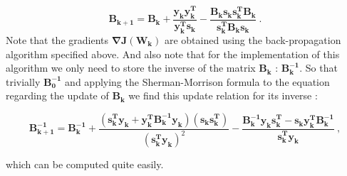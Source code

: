 \documentclass[a4paper,12pt,twoside]{article}
\newcommand{\matr}[1] {\bm{#1}}
\begin{document}
\begin{equation}
\matr{B_{k+1}} = \matr{B_k} + \frac{\mathbf{y_k}\mathbf{y_k^T}}{\mathbf{y_k^T}\mathbf{s_k}} - \frac{\matr{B_k}\mathbf{s_k}\mathbf{s_k^T}\matr{B_k}}{\mathbf{s_k^T}\matr{B_k}\mathbf{s_k}}~.
\end{equation}
Note that the gradients $\mathbf{\nabla J (\mathbf{W_k})}$ are obtained using the back-propagation algorithm specified above. And also note that for the implementation of this algorithm we only need to store the inverse of the matrix $\matr{B_k}$ : $\matr{B_k^{-1}}$. So that trivially $\matr{B_0^{-1}}$ and applying the Sherman-Morrison formula to the equation regarding the update of $\matr{B_k}$ we find this update relation for its inverse : 

\begin{equation}
\matr{B_{k+1}^{-1}} = \matr{B_k^{-1}} + \frac{(\mathbf{s_k^T}\mathbf{y_k} + \mathbf{y_k^T}\matr{B_k^{-1}}\mathbf{y_k})(\mathbf{s_k}\mathbf{s_k^T})}{(\mathbf{s_k^T}\mathbf{y_k})^2} - \frac{\matr{B_k^{-1}}\mathbf{y_k}\mathbf{s_k^T}-\mathbf{s_k}\mathbf{y_k^T}\matr{B_k^{-1}}}{\mathbf{s_k^T}\mathbf{y_k}}~,
\end{equation}

which can be computed quite easily.
\end{document}
